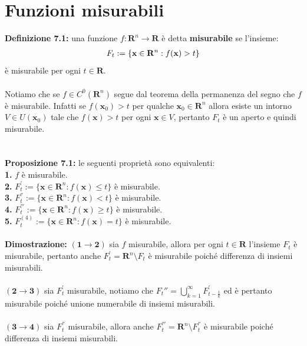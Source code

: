 \documentclass{article}
\begin{document}
\section{Funzioni misurabili}
\textbf{Definizione 7.1:} una funzione $f : \mathbf{R}^n \longrightarrow \mathbf{R}$ è detta \textbf{misurabile} se l'insieme:
\begin{gather}
    F_t := \{ \mathbf{x} \in \mathbf{R}^n : f(\mathbf{x}) > t \} \notag
\end{gather}
è misurabile per ogni $t \in \mathbf{R}$. \\ \\
Notiamo che se $f \in C^0 (\mathbf{R}^n)$ segue dal teorema della permanenza del segno che $f$ è misurabile. Infatti se $f(\mathbf{x}_0) > t$ per qualche $\mathbf{x}_0 \in \mathbf{R}^n$ allora esiste un intorno $V \in U(\mathbf{x}_0)$ tale che $f(\mathbf{x}) > t$ per ogni $\mathbf{x} \in V$, pertanto $F_t$ è un aperto e quindi misurabile. \\ \\ \\
\textbf{Proposizione 7.1:} le seguenti proprietà sono equivalenti: \\
\textbf{1.} $f$ è misurabile. \\
\textbf{2.} $F_t^{'} := \{ \mathbf{x} \in \mathbf{R}^n : f(\mathbf{x}) \leq t \}$ è misurabile. \\
\textbf{3.} $F_t^{''} := \{ \mathbf{x} \in \mathbf{R}^n : f(\mathbf{x}) < t \}$ è misurabile. \\
\textbf{4.} $F_t^{'''} := \{ \mathbf{x} \in \mathbf{R}^n : f(\mathbf{x}) \geq t \}$ è misurabile. \\
\textbf{5.} $F_t^{(4)} := \{ \mathbf{x} \in \mathbf{R}^n : f(\mathbf{x}) = t \}$ è misurabile. \\ \\
\textbf{Dimostrazione:} $\mathbf{(1 \rightarrow 2)}$ sia $f$ misurabile, allora per ogni $t \in \mathbf{R}$ l'insieme $F_t$ è misurabile, pertanto anche $F_t^{'} = \mathbf{R}^n \setminus F_t$ è misurabile poiché differenza di insiemi misurabili. \\ \\
$\mathbf{(2 \rightarrow 3)}$ sia $F_t^{'}$ misurabile, notiamo che $F_t{''} = \bigcup_{k = 1}^\infty F_{t - \frac{1}{k}}^{'}$ ed è pertanto misurabile poiché unione numerabile di insiemi misurabili. \\ \\
$\mathbf{(3 \rightarrow 4)}$ sia $F_t^{''}$ misurabile, allora anche $F_t^{'''} = \mathbf{R}^n \setminus F_t^{''}$ è misurabile poiché differenza di insiemi misurabili. \\ \\
\end{document}
